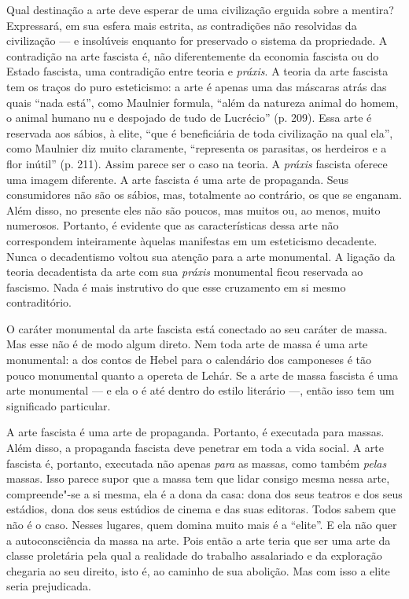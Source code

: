 Qual destinação a arte deve esperar de uma civilização erguida sobre a
mentira? Expressará, em sua esfera mais estrita, as contradições não resolvidas da civilização --- e insolúveis enquanto for preservado o sistema da propriedade.
A contradição na arte fascista é, não diferentemente da economia
fascista ou do Estado fascista, uma contradição entre teoria e
\emph{práxis}. A teoria da arte fascista tem os traços do puro
esteticismo: a arte é apenas uma das máscaras atrás das quais ``nada
está'', como Maulnier formula, ``além da natureza animal do homem, o
animal humano nu e despojado de tudo de Lucrécio'' (p. 209). Essa arte é
reservada aos sábios, à elite, ``que é beneficiária de toda civilização
na qual ela'', como Maulnier diz muito claramente, ``representa os
parasitas, os herdeiros e a flor inútil'' (p. 211). Assim parece ser o
caso na teoria. A \emph{práxis} fascista oferece uma imagem diferente.
A arte fascista é uma arte de propaganda. Seus consumidores não são os
sábios, mas, totalmente ao contrário, os que se enganam. Além disso, no
presente eles não são poucos, mas muitos ou, ao menos, muito numerosos.
Portanto, é evidente que as características dessa arte não correspondem
inteiramente àquelas manifestas em um esteticismo decadente. Nunca o
decadentismo voltou sua atenção para a arte monumental. A ligação da
teoria decadentista da arte com sua \emph{práxis} monumental ficou
reservada ao fascismo. Nada é mais instrutivo do que esse cruzamento
em si mesmo contraditório.

O caráter monumental da arte fascista está conectado ao seu caráter de
massa. Mas esse não é de modo algum direto. Nem toda arte de massa é uma
arte monumental: a dos contos de Hebel para o calendário dos camponeses
é tão pouco monumental quanto a opereta de Lehár. Se a arte de massa fascista
é uma arte monumental --- e ela o é até dentro do estilo literário ---,
então isso tem um significado particular.

A arte fascista é uma arte de propaganda. Portanto, é executada para
massas. Além disso, a propaganda fascista deve penetrar em toda a vida
social. A arte fascista é, portanto, executada não apenas \emph{para} as
massas, como também \emph{pelas} massas. Isso parece supor que a massa
tem que lidar consigo mesma nessa arte, compreende"-se a si mesma, ela é a
dona da casa: dona dos seus teatros e dos seus estádios, dona dos seus
estúdios de cinema e das suas editoras. Todos sabem que não é o caso.
Nesses lugares, quem domina muito mais é a ``elite''. E ela não quer a
autoconsciência da massa na arte. Pois então a arte teria que ser uma
arte da classe proletária pela qual a realidade do trabalho assalariado
e da exploração chegaria ao seu direito, isto é, ao caminho de sua
abolição. Mas com isso a elite seria prejudicada.

